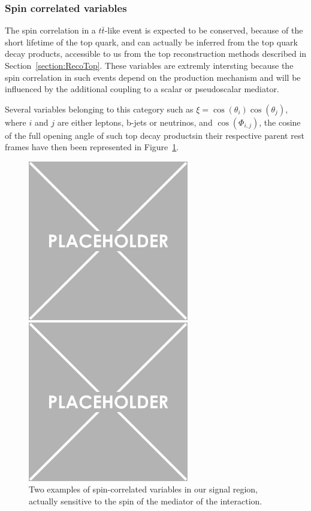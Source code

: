 \documentclass[a4paper, 10pt, openright]{report}
\begin{document}
\subsubsection*{Spin correlated variables}

The spin correlation in a $t \bar t$-like event is expected to be conserved, because of the short lifetime of the top quark, and can actually be inferred from the top quark decay products, accessible to us from the top reconstruction methods described in Section~\ref{section:RecoTop}. These variables are extremly intersting because the spin correlation in such events depend on the production mechanism and will be influenced by the additional coupling to a scalar or pseudoscalar mediator.

Several variables belonging to this category such as $\xi = \cos(\theta_i) \cos(\theta_j)$, where $i$ and $j$ are either leptons, b-jets or neutrinos, and $\cos(\Phi_{i,j})$, the cosine of the full opening angle of such top decay productsin their respective parent rest frames have then been represented in Figure~\ref{fig:SRdisc2}.

\begin{figure}[htbp]
\centering
\begin{minipage}[b]{.48\textwidth}
\includegraphics[width=7cm, height=7cm]{figs/placeholder.png}
\end{minipage}\hfill
\begin{minipage}[b]{.48\textwidth}
\includegraphics[width=7cm, height=7cm]{figs/placeholder.png}
\end{minipage} \hfill
\caption{Two examples of spin-correlated variables in our signal region, actually sensitive to the spin of the mediator of the interaction.}
\label{fig:SRdisc2}
\end{figure}
\end{document}
